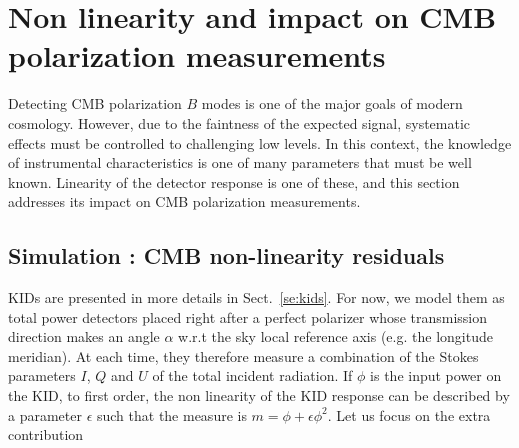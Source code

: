 
\section{Non linearity and impact on CMB polarization measurements}
\label{sec:cmb}



Detecting CMB polarization $B$ modes is one of the major goals of modern
cosmology. However, due to the faintness of the expected signal, systematic
effects must be controlled to challenging low levels. In this context, the
knowledge of instrumental characteristics is one of many parameters that must be
well known. Linearity of the detector response is one of these,
and this section addresses its impact on CMB polarization measurements.

\subsection{Simulation : CMB non-linearity residuals}

KIDs are presented in more details in Sect.~\ref{se:kids}. For now, we model
them as total power detectors placed right after a perfect polarizer whose
transmission direction makes an angle $\alpha$ w.r.t the sky local reference
axis (e.g. the longitude meridian). At each time, they therefore measure a
combination of the Stokes parameters $I$, $Q$ and $U$ of the total incident
radiation. If $\phi$ is the input power on the KID, to first order, the non
linearity of the KID response can be described by a parameter $\epsilon$ such
that the measure is $m=\phi + \epsilon\phi^2$. Let us focus on the
extra contribution

